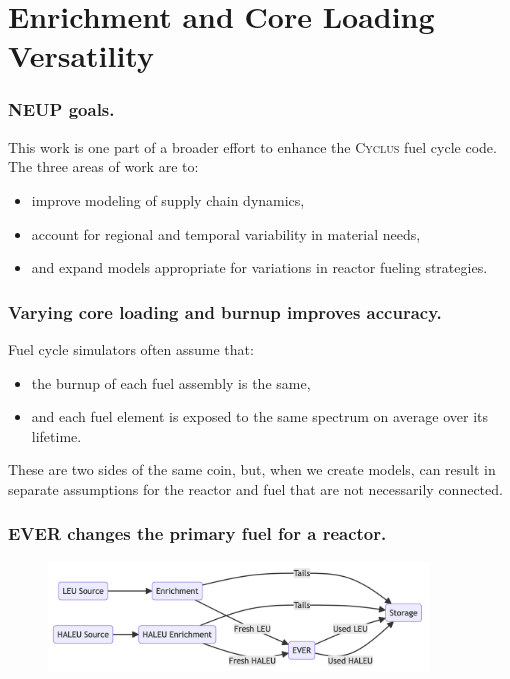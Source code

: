\documentclass[9pt]{beamer}
\newcommand{\cyclus}{\textsc{Cyclus}\xspace}
\begin{document}
\section{Enrichment and Core Loading Versatility}
\begin{frame}
  \frametitle{NEUP goals.}
  This work is one part of a broader effort to enhance the \cyclus fuel cycle code. The three areas of work are to:
  \begin{itemize}
    \item improve modeling of supply chain dynamics,
    \item account for regional and temporal variability in material needs,
    \item and expand models appropriate for variations in reactor fueling strategies.
  \end{itemize}
\end{frame}

\begin{frame}
  \frametitle{Varying core loading and burnup improves accuracy.}
  Fuel cycle simulators often \cite{out_of_core} assume that:
  \begin{itemize}
    \item the burnup of each fuel assembly is the same,
    \item and each fuel element is exposed to the same spectrum on average over its lifetime.
  \end{itemize}
  These are two sides of the same coin, but, when we create models, can result in separate assumptions for the reactor and fuel that are not necessarily connected.
\end{frame}

\begin{frame}
  \frametitle{EVER changes the primary fuel for a reactor.}
  \begin{figure}
    \centering
    \includegraphics[width=0.90\textwidth]{images/ever_diagram.png}
  \end{figure}
\end{frame}

\end{document}
